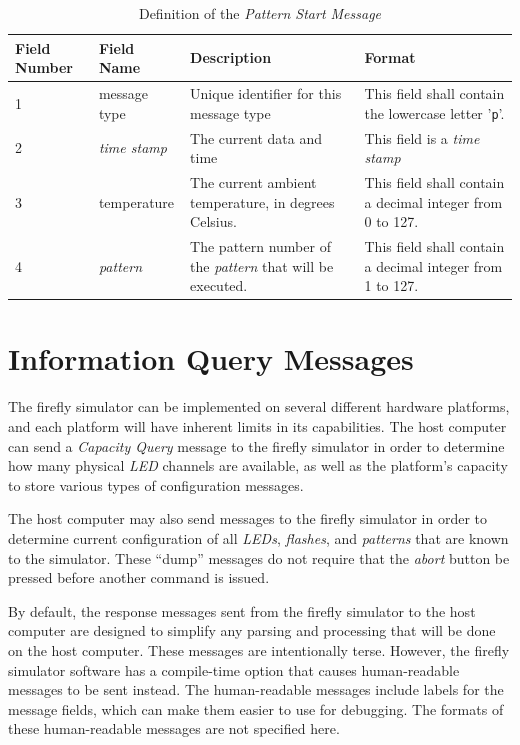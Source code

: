 \documentclass[letterpaper,11pt]{article}
\begin{document}
\begin{table}[H]
  \caption{Definition of the \textit{Pattern Start Message}}
  \centering
  \setlength\extrarowheight{2pt}
  \begin{tabular}[h]{|p{0.5in}|p{1.00in}|p{2.25in}|p{2.25in}|} \hline
    Field Number & Field Name & Description & Format \\ \hline
    1            & message type

    & Unique identifier for this message type
    & This field shall contain the lowercase letter '\texttt{p}'.
    \\ \hline
    2            & \textit{time stamp}
    & The current data and time
    & This field is a \textit{time stamp}
    \\ \hline
    3            & temperature
    & The current ambient temperature, in degrees Celsius.
    & This field shall contain a decimal integer from 0 to 127.
    \\ \hline
    4            & \textit{pattern}

    & The pattern number of the \textit{pattern} that will be executed.
    & This field shall contain a decimal integer from 1 to 127.
    \\ \hline
  \end{tabular}
  \label{tab:PatternStart}
\end{table}

\section{Information Query Messages}

The firefly simulator can be implemented on several different hardware
platforms, and each platform will have inherent limits in its capabilities.
The host computer can send a \textit{Capacity Query} message to the firefly
simulator in order to determine how many physical \textit{LED} channels are
available, as well as the platform's capacity to store various types of
configuration messages.

The host computer may also send messages to the firefly simulator in order to
determine current configuration of all \textit{LEDs}, \textit{flashes}, and
\textit{patterns} that are known to the simulator. These ``dump'' messages do
not require that the \textit{abort} button be pressed before another command
is issued.

By default, the response messages sent from the firefly simulator to the host
computer are designed to simplify any parsing and processing that will be done
on the host computer. These messages are intentionally terse. However, the
firefly simulator software has a compile-time option that causes human-readable
messages to be sent instead. The human-readable messages include labels for
the message fields, which can make them easier to use for debugging. The
formats of these human-readable messages are not specified here.
\end{document}
